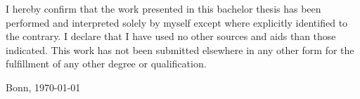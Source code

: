 I hereby confirm that the work presented in this bachelor thesis has been performed and interpreted solely by myself except where explicitly identified to the contrary. 
I declare that I have used no other sources and aids than those indicated. 
This work has not been submitted elsewhere in any other form for the fulfillment of any other degree or qualification.

\vspace*{3cm}
\par\noindent%
Bonn, \today \hfill \underline{\hspace*{5.5cm}}
\vspace*{\fill}